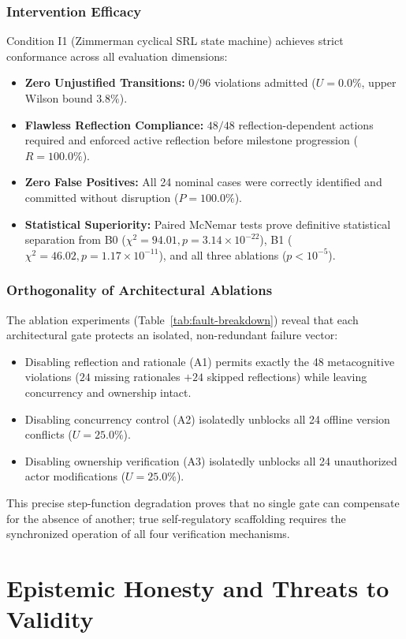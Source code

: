 \documentclass[11pt,a4paper]{article}
\begin{document}
\subsubsection{Intervention Efficacy}
Condition I1 (Zimmerman cyclical SRL state machine) achieves strict conformance across all evaluation dimensions:
\begin{itemize}
    \item \textbf{Zero Unjustified Transitions:} $0/96$ violations admitted ($U = 0.0\%$, upper Wilson bound $3.8\%$).
    \item \textbf{Flawless Reflection Compliance:} $48/48$ reflection-dependent actions required and enforced active reflection before milestone progression ($R = 100.0\%$).
    \item \textbf{Zero False Positives:} All 24 nominal cases were correctly identified and committed without disruption ($P = 100.0\%$).
    \item \textbf{Statistical Superiority:} Paired McNemar tests prove definitive statistical separation from B0 ($\chi^2 = 94.01, p = 3.14 \times 10^{-22}$), B1 ($\chi^2 = 46.02, p = 1.17 \times 10^{-11}$), and all three ablations ($p < 10^{-5}$).
\end{itemize}

\subsubsection{Orthogonality of Architectural Ablations}
The ablation experiments (Table~\ref{tab:fault-breakdown}) reveal that each architectural gate protects an isolated, non-redundant failure vector:
\begin{itemize}
    \item Disabling reflection and rationale (A1) permits exactly the 48 metacognitive violations ($24$ missing rationales $+ 24$ skipped reflections) while leaving concurrency and ownership intact.
    \item Disabling concurrency control (A2) isolatedly unblocks all 24 offline version conflicts ($U = 25.0\%$).
    \item Disabling ownership verification (A3) isolatedly unblocks all 24 unauthorized actor modifications ($U = 25.0\%$).
\end{itemize}
This precise step-function degradation proves that no single gate can compensate for the absence of another; true self-regulatory scaffolding requires the synchronized operation of all four verification mechanisms.

\section{Epistemic Honesty and Threats to Validity}
\end{document}
